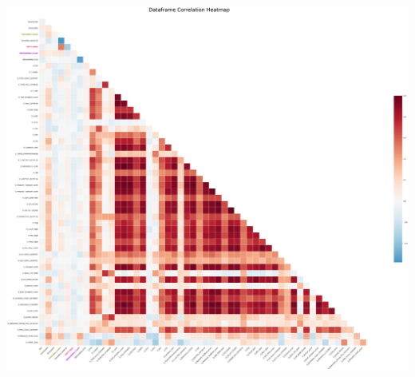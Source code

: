\documentclass[
  letterpaper,
  DIV=11,
  numbers=noendperiod]{scrartcl}
\begin{document}
\includegraphics[width=34.84375in,height=31.5625in]{xgboost_tuned_files/figure-pdf/cell-25-output-1.png}
\end{document}
